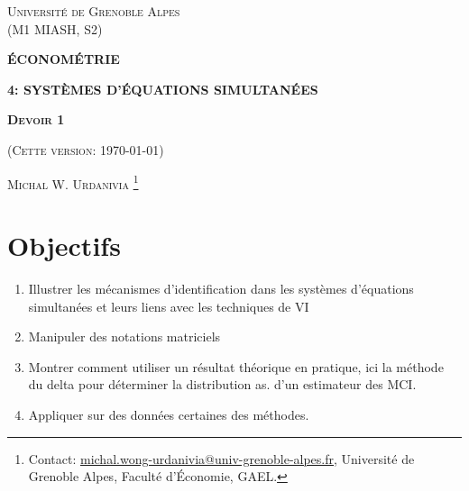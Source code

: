 \documentclass[10pt, reqno]{amsart}
\begin{document}
 
\usetikzlibrary{positioning}
\usetikzlibrary{snakes}
\usetikzlibrary{calc}
\usetikzlibrary{arrows}
\usetikzlibrary{decorations.markings}
\usetikzlibrary{shapes.misc}
\usetikzlibrary{shapes}

%

\begin{titlepage}
\centering
	{\scshape\Large \textsc{Université de Grenoble Alpes\\(M1 MIASH, S2)}\par}
	\vspace{0.5cm}
	{\Large\bfseries \scshape\Large \textsc{ÉCONOMÉTRIE}\par}
	{\Large\bfseries \textsc{4: SYSTÈMES D’ÉQUATIONS SIMULTANÉES} \par}
    \vspace{1cm}   
    {\Large\bfseries \textsc{Devoir 1} \par}
	{(\textsc{Cette version: \today})\par}
	\vspace{1cm}
	{\large \textsc{Michal W. Urdanivia}
	\footnote{Contact:  
	\href{mailto:michal.wong-urdanivia@univ-grenoble-alpes.fr}{michal.wong-urdanivia@univ-grenoble-alpes.fr}, 
	 Université de Grenoble Alpes,  Faculté d'\'Economie, GAEL.}\par}
	
\end{titlepage}


\newpage

\tableofcontents

\newpage

\section{Objectifs}
\begin{enumerate}
\item Illustrer les mécanismes d’identification dans les systèmes d’équations simultanées et leurs liens avec les techniques de VI
\item Manipuler des notations matriciels
\item Montrer comment utiliser un résultat théorique en pratique, ici la méthode du delta pour déterminer la distribution as. 
d’un estimateur des MCI.
\item Appliquer sur des données certaines des méthodes.
\end{enumerate}
\end{document}
